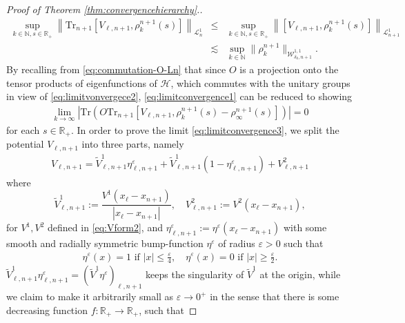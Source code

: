 \begin{proof}[Proof of Theorem \ref{thm:convergencehierarchy}.]
\begin{eqnarray*}
  \sup_{k \in \mathbb{N}, s \in \mathbb{R}_+} \left\| \mathrm{Tr}_{n + 1}
    [V_{\ell, n + 1}, \rho^{n + 1}_k (s)]\right \|_{\mathcal{L}^1_n} &\leqslant&
     \sup_{k \in \mathbb{N}, s \in \mathbb{R}_+}\left \| [V_{\ell, n + 1}, \rho^{n
     + 1}_k (s)] \right\|_{\mathcal{L}^1_{n + 1}} \\
     &\lesssim& \sup_{k \in \mathbb{N}}
     \| \rho^{n + 1}_k \|_{\mathcal{W}^{1, 1}_{\delta_k, n + 1}}.
      \end{eqnarray*}   
  By recalling from \eqref{eq:commutation-O-Ln} that since $O$ is a projection onto the tensor products of
  eigenfunctions of $\mathcal{H}$, which commutes with the unitary groups in view of
  \eqref{eq:limitvonvergece2}, \eqref{eq:limitconvergence1} can be reduced to
  showing
  \begin{align}
    \lim_{k \rightarrow \infty} \left| \mathrm{Tr} \left(O \mathrm{Tr}_{n + 1}
    \left[V_{\ell, n + 1}, \rho^{n + 1}_k (s) - \rho^{n + 1}_{\infty} (s)\right]\right) \right| = 0
    \label{eq:limitconvergence3}
  \end{align}
  for each $s \in \mathbb{R}_+$. In order to prove the limit
  \eqref{eq:limitconvergence3}, we split the potential $V_{\ell, n + 1}$ into
  three parts, namely
  \begin{align}
    V_{\ell, n + 1} = \tilde{V}^1_{\ell, n + 1} \eta^{\varepsilon}_{\ell, n +
    1} + \tilde{V}^1_{\ell, n + 1} (1 - \eta^{\varepsilon}_{\ell, n + 1}) +
    V^2_{\ell, n + 1} \label{eq:split-V-3}
  \end{align}
  where
  \[ \tilde{V}^1_{\ell, n + 1} := \frac{V^1 (x_{\ell} - x_{n + 1})}{|
     x_{\ell} - x_{n + 1} |}, \quad V^2_{\ell, n + 1} := V^2 (x_{\ell} -
     x_{n + 1}), \]
  for $V^1, V^2$ defined in \eqref{eq:Vform2}, and
  $\eta^{\varepsilon}_{\ell, n + 1} := \eta^{\varepsilon} (x_{\ell} -
  x_{n + 1})$ with some smooth and radially symmetric bump-function
  $\eta^{\varepsilon}$ of radius $\varepsilon > 0$ such that
  \begin{align*}
  \eta^{\varepsilon} (x) = 1 \text{ if } | x | \leq \frac{\varepsilon}{4},
     \quad \eta^{\varepsilon} (x) = 0 \text{ if } | x | \geq
     \frac{\varepsilon}{2} . 
     \end{align*}
  $\tilde{V}^1_{\ell, n + 1} \eta^{\varepsilon}_{\ell, n + 1} =
  (\tilde{V}^1 \eta^{\varepsilon})_{\ell, n + 1}$ keeps the singularity of
  $\tilde{V}^1$ at the origin, while we claim to make it arbitrarily small as
  $\varepsilon \rightarrow 0^+$ in the sense that there is some decreasing
  function $f : \mathbb{R}_+ \rightarrow \mathbb{R}_+$, such that

\end{proof}
